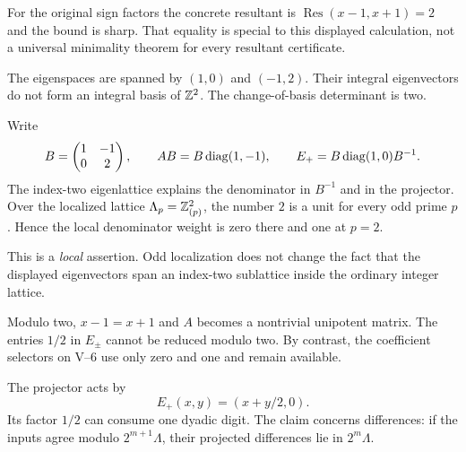 For the original sign factors the concrete resultant is $\operatorname{Res}(x-1,x+1)=2$ and the bound is sharp. That equality is special to this displayed calculation, not a universal minimality theorem for every resultant certificate.


The eigenspaces are spanned by $(1,0)$ and $(-1,2)$. Their integral eigenvectors do not form an integral basis of $\mathbb Z^2$. The change-of-basis determinant is two.


Write
\[
B=\begin{pmatrix}1&-1\\0&2\end{pmatrix},\qquad
AB=B\operatorname{diag}(1,-1),\qquad
E_+=B\operatorname{diag}(1,0)B^{-1}.
\]
The index-two eigenlattice explains the denominator in $B^{-1}$ and in the projector. Over the localized lattice $\Lambda_p=\mathbb Z_{(p)}^2$, the number $2$ is a unit for every odd prime $p$. Hence the local denominator weight is zero there and one at $p=2$.

This is a \emph{local} assertion. Odd localization does not change the fact that the displayed eigenvectors span an index-two sublattice inside the ordinary integer lattice.

Modulo two, $x-1=x+1$ and $A$ becomes a nontrivial unipotent matrix. The entries $1/2$ in $E_\pm$ cannot be reduced modulo two. By contrast, the coefficient selectors on V--6 use only zero and one and remain available.


The projector acts by
\[
E_+(x,y)=(x+y/2,0).
\]
Its factor $1/2$ can consume one dyadic digit. The claim concerns differences: if the inputs agree modulo $2^{m+1}\Lambda$, their projected differences lie in $2^m\Lambda$.

